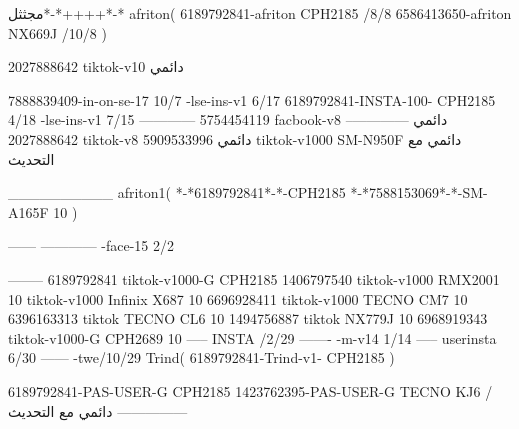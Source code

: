 مجثثل*-*++++*-*
afriton(
6189792841-afriton CPH2185  /8/8
6586413650-afriton NX669J  /10/8
)

2027888642 tiktok-v10
دائمي

7888839409-in-on-se-17 10/7
-lse-ins-v1 6/17
6189792841-INSTA-100- CPH2185 4/18
-lse-ins-v1 7/15
------------
5754454119 facbook-v8
دائمي
--------------
2027888642 tiktok-v8
دائمي
5909533996 tiktok-v1000  SM-N950F
دائمي مع التحديث

__________
afriton1(
*-*6189792841*-*-CPH2185
*-*7588153069*-*-SM-A165F 10
)


------
------------
-face-15 2/2

--------
6189792841 tiktok-v1000-G CPH2185 
1406797540 tiktok-v1000  RMX2001 10 tiktok-v1000  Infinix X687 10
6696928411 tiktok-v1000  TECNO CM7 10
6396163313 tiktok   TECNO CL6 10
1494756887 tiktok   NX779J 10
6968919343 tiktok-v1000-G   CPH2689 10
-----
 INSTA /2/29
-------
-m-v14 1/14
-----
userinsta 6/30
------
-twe/10/29
Trind(
6189792841-Trind-v1- CPH2185 
)


6189792841-PAS-USER-G CPH2185 
1423762395-PAS-USER-G TECNO KJ6  /دائمي مع التحديث
    ---------------
